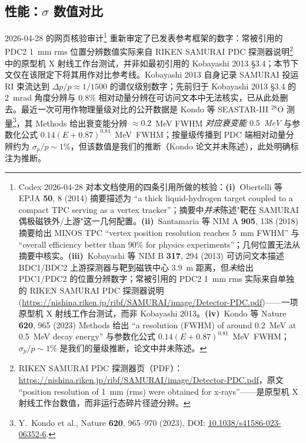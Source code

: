 \documentclass[a4paper, 11pt]{article}
\begin{document}
\subsection{性能：\texorpdfstring{$\sigma$}{sigma} 数值对比}
2026-04-28 的网页核验审计\footnote{\label{fn:codex_2026_04_28}Codex 2026-04-28 对本文档使用的四条引用所做的核验：\textbf{(i)}~Obertelli 等 EPJA \textbf{50}, 8 (2014) 摘要描述为 ``a thick liquid-hydrogen target coupled to a compact TPC serving as a vertex tracker''；摘要中\emph{并未}陈述"靶在 SAMURAI 偶极磁铁外/上游"这一几何配置。\textbf{(ii)}~Santamaria 等 NIM A \textbf{905}, 138 (2018) 摘要给出 MINOS TPC ``vertex position resolution reaches 5~mm FWHM'' 与 ``overall efficiency better than 90\% for physics experiments''；几何位置无法从摘要中核实。\textbf{(iii)}~Kobayashi 等 NIM B \textbf{317}, 294 (2013) 可访问文本描述 BDC1/BDC2 上游探测器与靶到磁铁中心 3.9~m 距离，但\emph{未}给出 PDC1/PDC2 的位置分辨数字；常被引用的 PDC2 1~mm rms 实际来自单独的 RIKEN SAMURAI PDC 探测器说明 (\url{https://nishina.riken.jp/ribf/SAMURAI/image/Detector-PDC.pdf})——一项原型机 X 射线工作台测试，而非 Kobayashi 2013。\textbf{(iv)}~Kondo 等 Nature \textbf{620}, 965 (2023) Methods 给出 ``a resolution (FWHM) of around 0.2~MeV at 0.5~MeV decay energy'' 与参数化公式 $0.14(E+0.87)^{0.81}$~MeV~FWHM；$\sigma_p/p \sim 1\%$ 是我们的量级推断，论文中并未陈述。} 重新审定了已发表参考框架的数字：常被引用的 PDC2 1~mm rms 位置分辨数值实际来自 RIKEN SAMURAI PDC 探测器说明\footnote{\label{fn:riken_pdc_note}RIKEN SAMURAI PDC 探测器页（PDF）：\url{https://nishina.riken.jp/ribf/SAMURAI/image/Detector-PDC.pdf}，原文 ``position resolution of 1~mm (rms) were obtained for x-rays''——是原型机 X 射线工作台数值，而非运行态碎片径迹分辨。} 中的原型机 X 射线工作台测试，并非如最初引用的 Kobayashi 2013 §3.4；本节下文仅在该限定下将其用作对比参考线。Kobayashi 2013 自身记录 SAMURAI 投运 RI 束流达到 $\Delta p/p \approx 1/1500$ 的谱仪级别数字；先前归于 Kobayashi 2013 §3.4 的 2~mrad 角度分辨与 0.8\% 相对动量分辨在可访问文本中无法核实，已从此处删去。最近一次可用作物理量级对比的公开数据是 Kondo 等 SEASTAR-III $^{28}$O 测量\footnote{\label{fn:kondo2023}Y.~Kondo et al., Nature \textbf{620}, 965--970 (2023), DOI: \href{https://doi.org/10.1038/s41586-023-06352-6}{10.1038/s41586-023-06352-6}.}，其 Methods 给出衰变能分辨 $\approx 0.2$~MeV FWHM \emph{对应衰变能 $0.5$~MeV} 与参数化公式 $0.14(E+0.87)^{0.81}$~MeV~FWHM；按量级传播到 PDC 端相对动量分辨约为 $\sigma_p/p \sim 1\%$，但该数值是我们的推断（Kondo 论文并未陈述），此处明确标注为推断。
\end{document}
